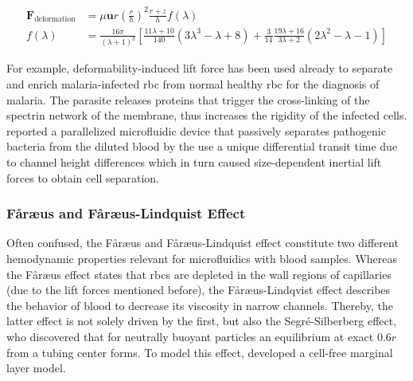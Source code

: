 \begin{align}
	\mathbf{F}_\text{deformation}&=\mu \mathbf{u} r \left(\frac{r}{h}\right)^{2} \frac{r+z}{h} f\left(\lambda\right) \label{eq:f:deform}\\
	f(\lambda) &=\frac{16 \pi}{\left(\lambda+1\right)^{3}}\left[\frac{11 \lambda+10}{140}\left(3 \lambda^{3}-\lambda+8\right)+\frac{3}{14} \frac{19 \lambda+16}{3 \lambda+2}\left(2 \lambda^{2}-\lambda-1\right)\right] 
\end{align}

For example, deformability-induced  lift  force  has  been  used  already to  separate  and  enrich  malaria-infected \gls{rbc}  from  normal  healthy  \gls{rbc} for  the  diagnosis  of  malaria.  The parasite releases proteins that trigger the cross-linking of the spectrin network of the membrane, thus increases the rigidity of the infected cells.\cite{lit:fluid:deformability}
\citet{lit:fluid:deformabilityDiCarlo} reported a parallelized  microfluidic  device  that  passively separates pathogenic bacteria from the diluted blood by the use a unique differential transit time due to channel height differences which in turn caused size-dependent inertial  lift forces to obtain cell separation.

\subsubsection{F\aa{}r\ae{}us and F\aa{}r\ae{}us-Lindquist Effect}
\label{sec:theo:faraeus}
Often confused, the F\aa{}r\ae{}us and F\aa{}r\ae{}us-Lindquist effect constitute two different hemodynamic properties relevant for microfluidics with blood samples. Whereas the  F\aa{}r\ae{}us effect states that \glspl{rbc} are depleted in the wall regions of capillaries (due to the lift forces mentioned before), the F\aa{}r\ae{}us-Lindqvist effect describes the behavior of blood to decrease its viscosity in narrow channels.\cite{lit:fluid:faraeus, lit:fluid:faraeuslinquvist} Thereby, the latter effect is not solely driven by the first, but also the Segr\'{e}-Silberberg effect, who discovered that for neutrally buoyant particles an equilibrium at exact $0.6r$ from a tubing center forms.\cite{lit:fluid:silberbereffect} To model this effect, \citet{lit:fluid:cell-free-model} developed a cell-free marginal layer model.


